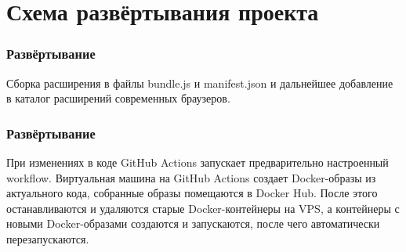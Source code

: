 	\section{Схема развёртывания проекта}
		\subsubsection{Развёртывание \Extensionbf{}}
			Сборка расширения в файлы bundle.js и manifest.json и дальнейшее добавление в каталог расширений современных браузеров.
		\subsubsection{Развёртывание \Server{}}
			При изменениях в коде GitHub Actions запускает предварительно настроенный workflow. Виртуальная 	машина на GitHub Actions создает Docker-образы из актуального кода, собранные образы помещаются в Docker Hub. После этого останавливаются и удаляются старые Docker-контейнеры на VPS, а контейнеры 
			с новыми Docker-образами создаются и запускаются, после чего \Serverbf{} автоматически перезапускаются.
